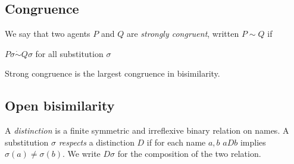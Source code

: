 % 
% 
% 

\subsection{Congruence}

\begin{definition}
  We say that two agents $P$ and $Q$ are \emph{strongly congruent}, written $P\sim Q$ if
  \begin{center}
    $P\sigma \dot{\sim} Q\sigma$ for all substitution $\sigma$    
  \end{center}
\end{definition}

\begin{proposition}
  Strong congruence is the largest congruence in bisimilarity.
\end{proposition}


\subsection{Open bisimilarity}

\begin{definition}
  A \emph{distinction} is a finite symmetric and irreflexive binary relation on names. A substitution $\sigma$ \emph{respects} a distinction $D$ if for each name $a,b$ $aDb$ implies $\sigma(a)\neq \sigma(b)$. We write $D\sigma$ for the composition of the two relation.
\end{definition}


